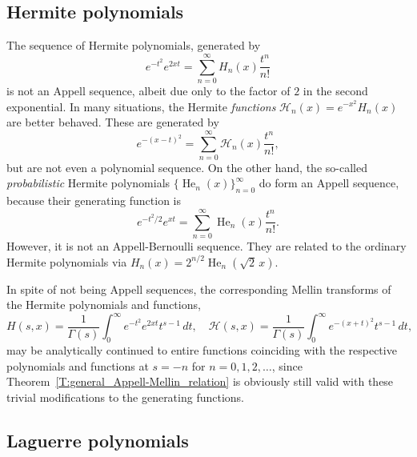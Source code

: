\documentclass[11pt,a4paper]{amsart}
\theoremstyle{plain}
\theoremstyle{plain}
\theoremstyle{definition}
\theoremstyle{remark}
\begin{document}
\subsection{Hermite polynomials}


The sequence of Hermite polynomials, generated by
% 
\begin{equation*}
  e^{-t^2} e^{2xt} = \sum_{n=0}^\infty H_{n}(x)\frac{t^n}{n!}
\end{equation*}
%
is not an Appell sequence, albeit due only to the factor of $2$ in the second exponential. In many situations, the Hermite \emph{functions} $\mathcal{H}_{n}(x) = e^{-x^2}H_{n}(x)$ are better behaved. These are generated by
% 
\begin{equation*}
  e^{-(x-t)^2} = \sum_{n=0}^\infty \mathcal{H}_{n}(x)\frac{t^n}{n!},
\end{equation*}
% 
but are not even a polynomial sequence. On the other hand, the so-called \emph{probabilistic} Hermite polynomials $\{\operatorname{He}_{n}(x)\}_{n=0}^{\infty}$ do form an Appell sequence, because their generating function is
\[
	e^{-t^2/2} e^{xt} = \sum_{n=0}^\infty \operatorname{He}_{n}(x)\frac{t^n}{n!}.
\]
However, it is not an Appell-Bernoulli sequence. They are related to the ordinary Hermite polynomials via $H_{n}(x) = 2^{n/2} \operatorname{He}_{n}(\sqrt{2}\,x)$. 

In spite of not being Appell sequences, the corresponding Mellin transforms of the Hermite polynomials and functions,
% 
\[
  H(s,x) = \frac{1}{\Gamma(s)} \int_{0}^{\infty} e^{-t^2}e^{2xt} t^{s-1}\,dt,
	\quad
  \mathcal{H}(s,x)  = \frac{1}{\Gamma(s)} \int_{0}^{\infty} e^{-(x+t)^2} t^{s-1}\,dt,
\]
% 
may be analytically continued to entire functions coinciding with the respective polynomials and functions at $s = -n$ for $n=0,1,2,\dots$, since Theorem~\ref{T:general_Appell-Mellin_relation} is obviously still valid with these trivial modifications to the generating functions.



\subsection{Laguerre polynomials} 
\end{document}
